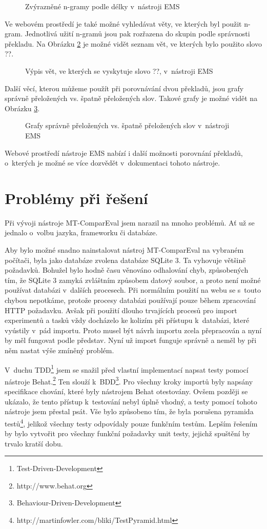 \begin{figure}
  \caption{Zvýrazněné \mbox{n-gramy} podle délky v~nástroji EMS}
  \label{img:ems-sentence}
\end{figure}

Ve webovém prostředí je také možné vyhledávat věty,
  ve kterých byl použit \mbox{n-gram}.
Jednotlivá užití \mbox{n-gramů} jsou pak rozřazena do skupin podle správnosti překladu.
Na Obrázku \ref{img:ems-word} je možné vidět seznam vět,
  ve kterých bylo použito slovo ??.

\begin{figure}
  \caption{Výpis vět, ve kterých se vyskytuje slovo ??, v~nástroji EMS}
  \label{img:ems-word}
\end{figure}

Další věcí, kterou můžeme použít při porovnávání dvou překladů,
  jsou grafy správně přeložených vs. špatně přeložených slov.
Takové grafy je možné vidět na Obrázku \ref{img:ems-charts}.

\begin{figure}
  \caption{Grafy správně přeložených vs. špatně přeložených slov v~nástroji EMS}
  \label{img:ems-charts}
\end{figure}

Webové prostředí nástroje EMS nabízí i další možnosti porovnání překladů,
  o~kterých je možné se více dozvědět v~dokumentaci tohoto nástroje.

\section{Problémy při řešení}
Při vývoji nástroje MT-ComparEval jsem narazil na mnoho problémů.
Ať už se jednalo o~volbu jazyka, frameworku či databáze.

Aby bylo možné snadno nainstalovat nástroj MT-ComparEval na vybraném počítači,
  byla jako databáze zvolena databáze SQLite 3.
Ta vyhovuje většině požadavků.
Bohužel bylo hodně času věnováno odhalování chyb,
  způsobených tím,
  že SQLite 3 zamyká zvláštním způsobem datový soubor,
  a proto není možné používat databázi v~dalších procesech.
Při normálním použití na webu se s~touto chybou nepotkáme,
  protože procesy databázi používají pouze během zpracování HTTP požadavku.
Avšak při použití dlouho trvajících procesů pro import experimentů a tasků
  vždy docházelo ke kolizím při přístupu k~databázi,
  které vyústily v~pád importu.
Proto musel být návrh importu zcela přepracován a nyní by měl fungovat podle představ.
Nyní už import funguje správně a neměl by při něm nastat výše zmíněný problém.


V~duchu TDD\footnote{Test-Driven-Development}
  jsem se snažil před vlastní implementací napsat testy pomocí nástroje Behat.\footnote{http://www.behat.org}
Ten slouží k~BDD\footnote{Behaviour-Driven-Development}.
Pro všechny kroky importů byly napsány specifikace chování, které byly nástrojem Behat otestovány.
Ovšem později se ukázalo, že tento přístup k~testování nebyl úplně vhodný, a testy pomocí tohoto nástroje jsem přestal psát.
Vše bylo způsobeno tím, že byla porušena pyramida testů\footnote{http://martinfowler.com/bliki/TestPyramid.html},
  jelikož všechny testy odpovídaly pouze funkčním testům.
Lepším řešením by bylo vytvořit pro všechny funkční požadavky unit testy,
  jejichž spuštění by trvalo kratší dobu.
